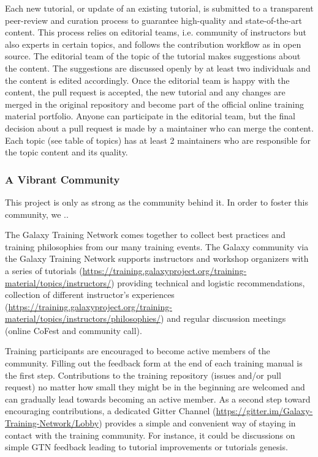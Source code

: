 \documentclass[10pt,letterpaper]{article}
\begin{document}
Each new tutorial, or update of an existing tutorial, is submitted to a transparent peer-review and curation process to guarantee high-quality and state-of-the-art content.
This process relies on editorial teams, i.e. community of instructors but also experts in certain topics, and follows the contribution workflow as in open source.
The editorial team of the topic of the tutorial makes suggestions about the content.
The suggestions are discussed openly by at least two individuals and the content is edited accordingly.
Once the editorial team is happy with the content, the pull request is accepted, the new tutorial and any changes are merged in the original repository and become part of the official online training material portfolio.
Anyone can participate in the editorial team, but the final decision about a pull request is made by a maintainer who can merge the content.
Each topic (see table of topics) has at least 2 maintainers who are responsible for the topic content and its quality.

\subsubsection*{A Vibrant Community}
This project is only as strong as the community behind it. In order to foster this community, we ..

The Galaxy Training Network comes together to collect best practices and training philosophies from our many training events.
The Galaxy community via the Galaxy Training Network supports instructors and workshop organizers with a series of tutorials (\url{https://training.galaxyproject.org/training-material/topics/instructors/}) providing technical and logistic recommendations, collection of different instructor’s experiences (\url{https://training.galaxyproject.org/training-material/topics/instructors/philosophies/}) and regular discussion meetings (online CoFest and community call).

Training participants are encouraged to become active members of the community.
Filling out the feedback form at the end of each training manual is the first step. Contributions to the training repository (issues and/or pull request) no matter how small they might be in the beginning are welcomed and can gradually lead towards becoming an active member.
As a second step toward encouraging contributions, a dedicated Gitter Channel (\url{https://gitter.im/Galaxy-Training-Network/Lobby}) provides a simple and convenient way of staying in contact with the training community.
For instance, it could be discussions on simple GTN feedback leading to tutorial improvements or tutorials genesis.
\end{document}
